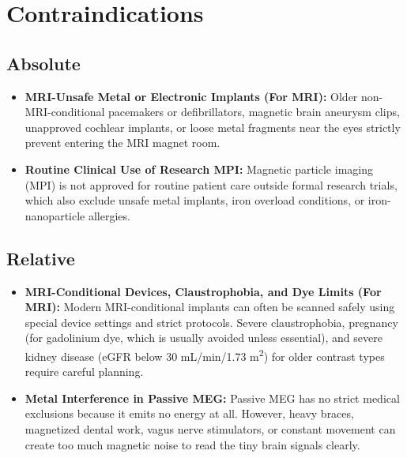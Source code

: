 \section{Contraindications}

\subsection{Absolute}
\begin{itemize}
  \item \textbf{MRI-Unsafe Metal or Electronic Implants (For MRI):} Older non-MRI-conditional pacemakers or defibrillators, magnetic brain aneurysm clips, unapproved cochlear implants, or loose metal fragments near the eyes strictly prevent entering the MRI magnet room.
  \item \textbf{Routine Clinical Use of Research MPI:} Magnetic particle imaging (MPI) is not approved for routine patient care outside formal research trials, which also exclude unsafe metal implants, iron overload conditions, or iron-nanoparticle allergies.
\end{itemize}

\subsection{Relative}
\begin{itemize}
  \item \textbf{MRI-Conditional Devices, Claustrophobia, and Dye Limits (For MRI):} Modern MRI-conditional implants can often be scanned safely using special device settings and strict protocols. Severe claustrophobia, pregnancy (for gadolinium dye, which is usually avoided unless essential), and severe kidney disease (eGFR below 30 mL/min/1.73 m\textsuperscript{2}) for older contrast types require careful planning.
  \item \textbf{Metal Interference in Passive MEG:} Passive MEG has no strict medical exclusions because it emits no energy at all. However, heavy braces, magnetized dental work, vagus nerve stimulators, or constant movement can create too much magnetic noise to read the tiny brain signals clearly.
\end{itemize}

